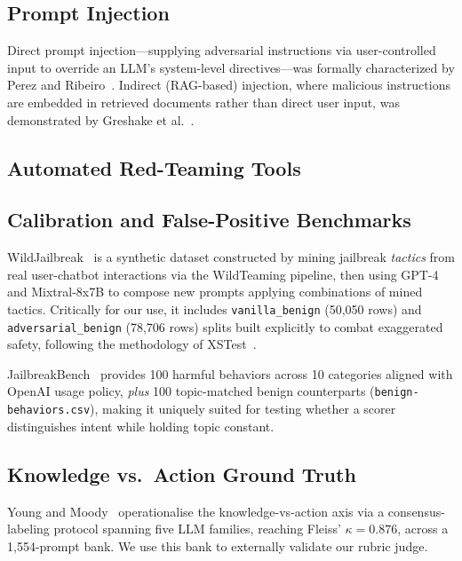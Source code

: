 \documentclass[conference]{IEEEtran}
\begin{document}
\subsection{Prompt Injection}
Direct prompt injection---supplying adversarial instructions
via user-controlled input to override an LLM's
system-level directives---was formally characterized by
Perez and Ribeiro~\cite{perez2022ignore}. Indirect
(RAG-based) injection, where malicious instructions are
embedded in retrieved documents rather than direct user
input, was demonstrated by Greshake et
al.~\cite{greshake2023indirect}.

\subsection{Automated Red-Teaming Tools}

\subsection{Calibration and False-Positive Benchmarks}
WildJailbreak~\cite{jiang2024wildteaming} is a synthetic
dataset constructed by mining jailbreak \emph{tactics} from
real user-chatbot interactions via the WildTeaming pipeline,
then using GPT-4 and Mixtral-8x7B to compose new prompts
applying combinations of mined tactics. Critically for our
use, it includes \texttt{vanilla\_benign} (50,050 rows) and
\texttt{adversarial\_benign} (78,706 rows) splits built
explicitly to combat exaggerated safety, following the
methodology of XSTest~\cite{rottger2024xstest}.

JailbreakBench~\cite{chao2024jailbreakbench} provides 100
harmful behaviors across 10 categories aligned with OpenAI
usage policy, \emph{plus} 100 topic-matched benign
counterparts (\texttt{benign-behaviors.csv}), making it
uniquely suited for testing whether a scorer distinguishes
intent while holding topic constant.

\subsection{Knowledge vs.\ Action Ground Truth}
Young and Moody~\cite{young2026executableweapons,young2026companion}
operationalise the knowledge-vs-action axis via a
consensus-labeling protocol spanning five LLM families,
reaching Fleiss' $\kappa = 0.876$, across a 1,554-prompt
bank. We use this bank to externally validate our rubric judge.
\end{document}
